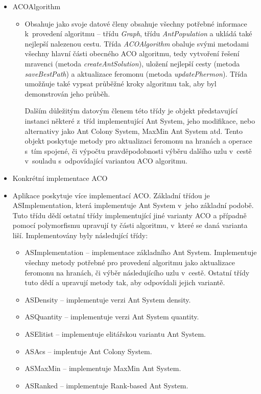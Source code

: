 \documentclass[a4paper, 12pt]{article}
\begin{document}
\begin{itemize}
  \item ACOAlgorithm
  \begin{itemize}
    \item[] Obsahuje jako svoje datové členy obsahuje všechny potřebné informace k~provedení algoritmu -- třídu
    \emph{Graph}, třídu \emph{AntPopulation} a ukládá také nejlepší nalezenou cestu. Třída \emph{ACOAlgorithm} obaluje svými metodami všechny hlavní části obecného
    ACO algoritmu, tedy vytvoření řešení mravenci (metoda \emph{createAntSolution}), uložení nejlepší cesty (metoda \emph{saveBestPath}) 
    a aktualizace feromonu (metoda \emph{updatePhermon}). Třída umožňuje také vypsat průběžné kroky algoritmu tak, aby byl demonstrován jeho průběh.

    Dalším důležitým datovým členem této třídy je objekt představující instanci některé z~tříd implementující Ant System, jeho modifikace, nebo alternativy jako
    Ant Colony System, MaxMin Ant System atd. Tento objekt poskytuje metody pro aktualizaci feromonu na hranách a operace s~tím spojené,
    či výpočtu pravděpodobnosti výběru dalšího uzlu v~cestě v~souladu s~odpovídající variantou ACO algoritmu.
  \end{itemize}
  \item Konkrétní implementace ACO
    \item[] Aplikace poskytuje více implementací ACO. Základní třídou je ASImplementation, která implementuje Ant System v~jeho základní podobě. Tuto třídu
    dědí ostatní třídy implementující jiné varianty ACO a případně pomocí polymorfismu upravují ty části algoritmu, v~které se daná varianta liší. Implementovány
    byly následující třídy:
    \begin{itemize}
      \item ASImplementation -- implementace základního Ant System. Implementuje všechny metody potřebné pro provedení algoritmu jako aktualizace feromonu na
      hranách, či výběr následujícího uzlu v~cestě. Ostatní třídy tuto dědí a upravují metody tak, aby odpovídali jejich variantě.
      \item ASDensity -- implementuje verzi Ant System density.
      \item ASQuantity -- implementuje verzi Ant System quantity.
      \item ASElitist -- implementuje elitářskou variantu Ant System.
      \item ASAcs -- implentuje Ant Colony System.
      \item ASMaxMin -- implementuje MaxMin Ant System.
      \item ASRanked -- implementuje Rank-based Ant System.
    \end{itemize}
\end{itemize}
\end{document}
